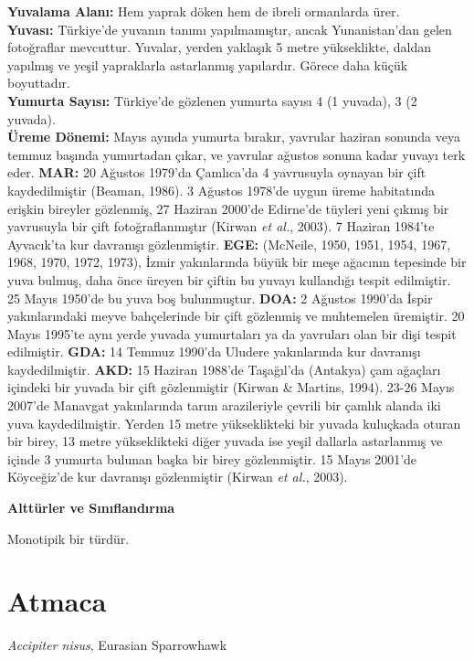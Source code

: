 \documentclass[
  a4paper,
  DIV=11,
  numbers=noendperiod]{scrreprt}
\begin{document}
\textbf{Yuvalama Alanı:} Hem yaprak döken hem de ibreli ormanlarda
ürer.\\
\textbf{Yuvası:} Türkiye'de yuvanın tanımı yapılmamıştır, ancak
Yunanistan'dan gelen fotoğraflar mevcuttur. Yuvalar, yerden yaklaşık 5
metre yükseklikte, daldan yapılmış ve yeşil yapraklarla astarlanmış
yapılardır. Görece daha küçük boyuttadır.\\
\textbf{Yumurta Sayısı:} Türkiye'de gözlenen yumurta sayısı 4 (1
yuvada), 3 (2 yuvada).\\
\textbf{Üreme Dönemi:} Mayıs ayında yumurta bırakır, yavrular haziran
sonunda veya temmuz başında yumurtadan çıkar, ve yavrular ağustos sonuna
kadar yuvayı terk eder. \textbf{MAR:} 20 Ağustos 1979'da Çamlıca'da 4
yavrusuyla oynayan bir çift kaydedilmiştir (Beaman, 1986). 3 Ağustos
1978'de uygun üreme habitatında erişkin bireyler gözlenmiş, 27 Haziran
2000'de Edirne'de tüyleri yeni çıkmış bir yavrusuyla bir çift
fotoğraflanmıştır (Kirwan \emph{et al.}, 2003). 7 Haziran 1984'te
Ayvacık'ta kur davranışı gözlenmiştir. \textbf{EGE:} (McNeile, 1950,
1951, 1954, 1967, 1968, 1970, 1972, 1973), İzmir yakınlarında büyük bir
meşe ağacının tepesinde bir yuva bulmuş, daha önce üreyen bir çiftin bu
yuvayı kullandığı tespit edilmiştir. 25 Mayıs 1950'de bu yuva boş
bulunmuştur. \textbf{DOA:} 2 Ağustos 1990'da İspir yakınlarındaki meyve
bahçelerinde bir çift gözlenmiş ve muhtemelen üremiştir. 20 Mayıs
1995'te aynı yerde yuvada yumurtaları ya da yavruları olan bir dişi
tespit edilmiştir. \textbf{GDA:} 14 Temmuz 1990'da Uludere yakınlarında
kur davranışı kaydedilmiştir. \textbf{AKD:} 15 Haziran 1988'de
Taşağıl'da (Antakya) çam ağaçları içindeki bir yuvada bir çift
gözlenmiştir (Kirwan \& Martins, 1994). 23-26 Mayıs 2007'de Manavgat
yakınlarında tarım arazileriyle çevrili bir çamlık alanda iki yuva
kaydedilmiştir. Yerden 15 metre yükseklikteki bir yuvada kuluçkada
oturan bir birey, 13 metre yükseklikteki diğer yuvada ise yeşil dallarla
astarlanmış ve içinde 3 yumurta bulunan başka bir birey gözlenmiştir. 15
Mayıs 2001'de Köyceğiz'de kur davranışı gözlenmiştir (Kirwan \emph{et
al.}, 2003).

\textbf{Alttürler ve Sınıflandırma}

Monotipik bir türdür.

\section{Atmaca}\label{atmaca}

\emph{Accipiter nisus}, Eurasian Sparrowhawk
\end{document}
